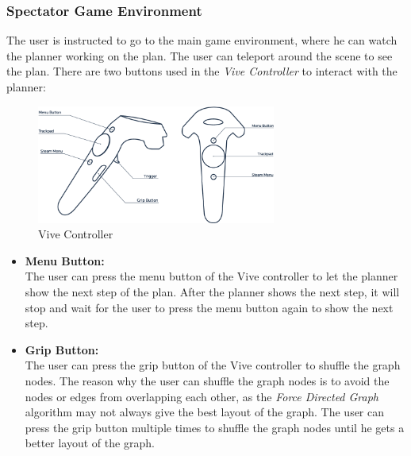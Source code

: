 \subsubsection{Spectator Game Environment} \label{subsubsec:spectator_game_environment}
The user is instructed to go to the main game environment, where he can watch the planner working on the plan. The user can teleport around the scene to see the plan.
There are two buttons used in the \textit{Vive Controller} to interact with the planner:

\begin{figure}[H]
    \centering
    \includegraphics[width=0.7\textwidth]{images/vive_controller.png}
    \caption[Vive Controller]{Vive Controller\cite{UE4ViveController}}
    \label{fig:vive_controller}
\end{figure}

\begin{itemize}
    \item \textbf{Menu Button:} \\
          The user can press the menu button of the Vive controller to let the planner show the next step of the plan. After the planner shows the next step, it will stop and wait for the user to press the menu button again to show the next step.

    \item \textbf{Grip Button:} \\
          The user can press the grip button of the Vive controller to shuffle the graph nodes. The reason why the user can shuffle the graph nodes is to avoid the nodes or edges from overlapping each other, as the \textit{Force Directed Graph} algorithm may not always give the best layout of the graph. The user can press the grip button multiple times to shuffle the graph nodes until he gets a better layout of the graph.
\end{itemize}



